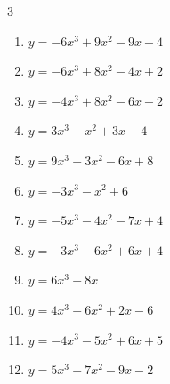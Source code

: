 \begin{multicols}{3}
\begin{enumerate}

  \item $y=-6x^{3}+9x^{2}-9x-4$


  \item $y=-6x^{3}+8x^{2}-4x+2$


  \item $y=-4x^{3}+8x^{2}-6x-2$


  \item $y=3x^{3}-x^{2}+3x-4$


  \item $y=9x^{3}-3x^{2}-6x+8$


  \item $y=-3x^{3}-x^{2}+6$


\columnbreak %

  \item $y=-5x^{3}-4x^{2}-7x+4$


  \item $y=-3x^{3}-6x^{2}+6x+4$


  \item $y=6x^{3}+8x$


  \item $y=4x^{3}-6x^{2}+2x-6$


  \item $y=-4x^{3}-5x^{2}+6x+5$


  \item $y=5x^{3}-7x^{2}-9x-2$



\end{enumerate}
\end{multicols}

